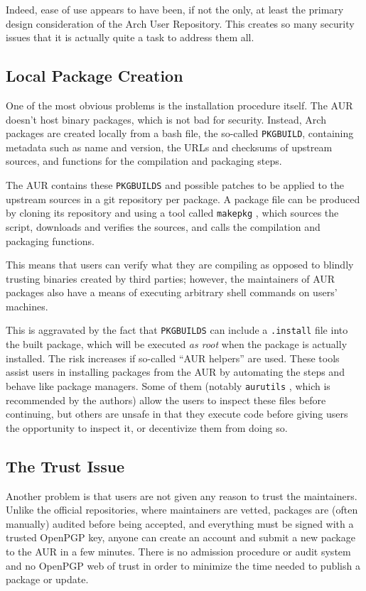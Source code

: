 Indeed, ease of use appears to have been, if not the only, at least the primary design consideration of the Arch User Repository. This creates so many security issues that it is actually quite a task to address them all.

\subsection{Local Package Creation}
One of the most obvious problems is the installation procedure itself.
The AUR doesn't host binary packages, which is not bad for security. Instead, Arch packages are created locally from a bash file, the so-called \texttt{PKGBUILD}, containing metadata such as name and version, the URLs and checksums of upstream sources, and functions for the compilation and packaging steps. %

The AUR contains these \texttt{PKGBUILDS} and possible patches to be applied to the upstream sources in a git repository per package.
A package file can be produced by cloning its repository and using a tool called \texttt{makepkg} \cite{wiki:PackageCreation}, which sources the script, downloads and verifies the sources, and calls the compilation and packaging functions.

This means that users can verify what they are compiling as opposed to blindly trusting binaries created by third parties; however, the maintainers of AUR packages also have a means of executing arbitrary shell commands on users' machines.

This is aggravated by the fact that \texttt{PKGBUILDS} can include a \texttt{.install} file into the built package, which will be executed \emph{as root} when the package is actually installed.
The risk increases if so-called \enquote{AUR helpers} are used. These tools assist users in installing packages from the AUR by automating the steps and behave like package managers.
Some of them (notably \texttt{aurutils} \cite{gh:aurutils}, which is recommended by the authors) allow the users to inspect these files before continuing, but others are unsafe in that they execute code before giving users the opportunity to inspect it, or decentivize them from doing so.

\subsection{The Trust Issue}
Another problem is that users are not given any reason to trust the maintainers.
Unlike the official repositories, where maintainers are vetted, packages are (often manually) audited before being accepted, and everything must be signed with a trusted OpenPGP key, anyone can create an account and submit a new package to the AUR in a few minutes.
There is no admission procedure or audit system and no OpenPGP web of trust in order to minimize the time needed to publish a package or update.

